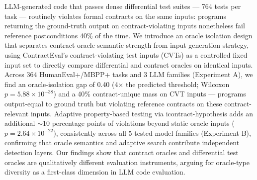 LLM-generated code that passes dense differential test suites --- 764 tests per task --- routinely violates formal contracts on the same inputs: programs returning the ground-truth output on contract-violating inputs nonetheless fail reference postconditions 40\% of the time. We introduce an oracle isolation design that separates contract oracle semantic strength from input generation strategy, using ContractEval's contract-violating test inputs (CVTs) as a controlled fixed input set to directly compare differential and contract oracles on identical inputs. Across 364 HumanEval+/MBPP+ tasks and 3 LLM families (Experiment A), we find an oracle-isolation gap of 0.40 (4$\times$ the predicted threshold; Wilcoxon $p = 5.88 \times 10^{-38}$) and a 40\% contract-unique mass on CVT inputs --- programs output-equal to ground truth but violating reference contracts on these contract-relevant inputs. Adaptive property-based testing via icontract-hypothesis adds an additional $\sim$10 percentage points of violations beyond static oracle inputs ($p = 2.64 \times 10^{-22}$), consistently across all 5 tested model families (Experiment B), confirming that oracle semantics and adaptive search contribute independent detection layers. Our findings show that contract oracles and differential test oracles are qualitatively different evaluation instruments, arguing for oracle-type diversity as a first-class dimension in LLM code evaluation.
